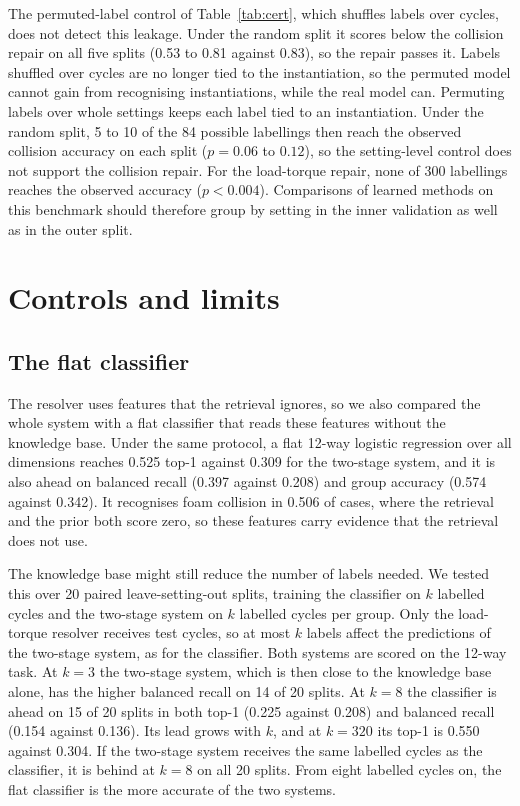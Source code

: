 \documentclass{ifacconf}
\begin{document}
The permuted-label control of Table~\ref{tab:cert}, which shuffles labels over
cycles, does not detect this leakage. Under the random split it scores below the
collision repair on all five splits (0.53 to 0.81 against
0.83), so the repair passes it. Labels shuffled over cycles are no longer tied to
the instantiation, so the permuted model cannot gain from recognising
instantiations, while the real model can. Permuting labels over whole settings
keeps each label tied to an instantiation. Under the random split, 5 to 10 of the
84 possible labellings then reach the observed collision accuracy on each split
($p = 0.06$ to $0.12$), so the setting-level control does not support the
collision repair. For the load-torque repair, none of 300 labellings reaches the
observed accuracy ($p < 0.004$). Comparisons of learned methods on this
benchmark should therefore group by setting in the
inner validation as well as in the outer split.

\section{Controls and limits}
\label{sec:neg}

\subsection{The flat classifier}

The resolver uses features that the retrieval ignores, so we also compared the
whole system with a flat classifier that reads these features without the
knowledge base. Under the same protocol, a flat 12-way logistic regression over
all dimensions reaches 0.525 top-1 against 0.309 for the two-stage system, and
it is also ahead on balanced recall (0.397 against 0.208) and group accuracy
(0.574 against 0.342). It recognises foam collision in 0.506 of cases, where the
retrieval and the prior both score zero, so these features carry evidence that
the retrieval does not use.

The knowledge base might still reduce the number of labels needed. We tested
this over 20 paired leave-setting-out splits, training the classifier on $k$
labelled cycles and the two-stage system on $k$ labelled cycles per group. Only
the load-torque resolver receives test cycles, so at most $k$ labels affect the
predictions of the two-stage system, as for the classifier. Both systems are
scored on the 12-way task. At $k = 3$ the two-stage system, which is then close
to the knowledge base alone, has the higher balanced recall on 14 of 20 splits.
At $k = 8$ the classifier is ahead on 15 of 20 splits in both top-1 (0.225
against 0.208) and balanced recall (0.154 against 0.136). Its lead grows with
$k$, and at $k = 320$ its top-1 is 0.550 against 0.304. If the two-stage system
receives the same labelled cycles as the classifier, it is behind at $k = 8$ on
all 20 splits. From eight labelled cycles on, the flat classifier is the more
accurate of the two systems.
\end{document}
